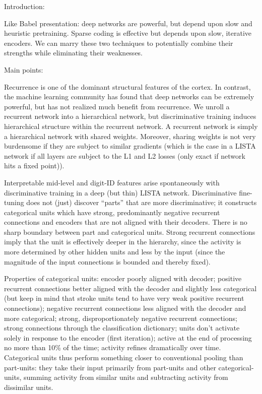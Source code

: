 Introduction:

Like Babel presentation: deep networks are powerful, but depend upon slow and heuristic pretraining.  Sparse coding is effective but depends upon slow, iterative encoders.  We can marry these two techniques to potentially combine their strengths while eliminating their weaknesses.




Main points:

Recurrence is one of the dominant structural features of the cortex.  In contrast, the machine learning community has found that deep networks can be extremely powerful, but has not realized much benefit from recurrence.  We unroll a recurrent network into a hierarchical network, but discriminative training induces hierarchical structure within the recurrent network.  A recurrent network is simply a hierarchical network with shared weights.  Moreover, sharing weights is not very burdensome if they are subject to similar gradients (which is the case in a LISTA network if all layers are subject to the L1 and L2 losses (only exact if network hits a fixed point)).  

Interpretable mid-level and digit-ID features arise spontaneously with discriminative training in a deep (but thin) LISTA network.  Discriminative fine-tuning does not (just) discover ``parts'' that are more discriminative; it constructs categorical units which have strong, predominantly negative recurrent connections and encoders that are not aligned with their decoders.  There is no sharp boundary between part and categorical units.  Strong recurrent connections imply that the unit is effectively deeper in the hierarchy, since the activity is more determined by other hidden units and less by the input (since the magnitude of the input connections is bounded and thereby fixed).

Properties of categorical units: encoder poorly aligned with decoder; positive recurrent connections better aligned with the decoder and slightly less categorical (but keep in mind that stroke units tend to have very weak positive recurrent connections); negative recurrent connections less aligned with the decoder and more categorical; strong, disproportionately negative recurrent connections; strong connections through the classification dictionary; units don't activate solely in response to the encoder (first iteration); active at the end of processing no more than 10\% of the time; activity refines dramatically over time.  Categorical units thus perform something closer to conventional pooling than part-units: they take their input primarily from part-units and other categorical-units, summing activity from similar units and subtracting activity from dissimilar units.  

